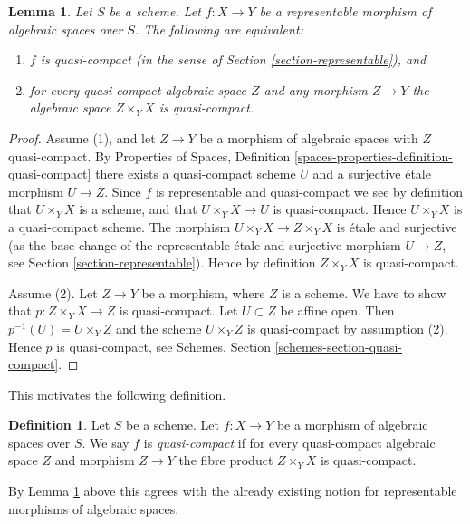 \documentclass{stacks-project}
\theoremstyle{plain}
\newtheorem{lemma}[subsection]{Lemma}
\theoremstyle{definition}
\newtheorem{definition}[subsection]{Definition}
\theoremstyle{remark}
\numberwithin{equation}{subsection}
\begin{document}
\begin{lemma}
\label{lemma-characterize-representable-quasi-compact}
Let $S$ be a scheme.
Let $f : X \to Y$ be a representable morphism of algebraic spaces over $S$.
The following are equivalent:
\begin{enumerate}
\item $f$ is quasi-compact
(in the sense of Section \ref{section-representable}), and
\item for every quasi-compact algebraic space $Z$ and any morphism
$Z \to Y$ the algebraic space $Z \times_Y X$ is quasi-compact.
\end{enumerate}
\end{lemma}

\begin{proof}
Assume (1), and let $Z \to Y$ be a morphism of algebraic spaces with
$Z$ quasi-compact. By
Properties of Spaces,
Definition \ref{spaces-properties-definition-quasi-compact}
there exists a quasi-compact scheme $U$ and a surjective \'etale
morphism $U \to Z$. Since $f$ is representable and quasi-compact
we see by definition that $U \times_Y X$ is a scheme, and that
$U \times_Y X \to U$ is quasi-compact. Hence $U \times_Y X$ is
a quasi-compact scheme. The morphism $U \times_Y X \to Z \times_Y X$
is \'etale and surjective (as the base change of the representable
\'etale and surjective morphism $U \to Z$, see
Section \ref{section-representable}).
Hence by definition $Z \times_Y X$ is quasi-compact.

\medskip\noindent
Assume (2). Let $Z \to Y$ be a morphism, where $Z$ is a scheme.
We have to show that $p : Z \times_Y X \to Z$ is quasi-compact.
Let $U \subset Z$ be affine open. Then $p^{-1}(U) = U \times_Y Z$
and the scheme $U \times_Y Z$ is quasi-compact by assumption (2).
Hence $p$ is quasi-compact, see
Schemes, Section \ref{schemes-section-quasi-compact}.
\end{proof}

\noindent
This motivates the following definition.

\begin{definition}
\label{definition-quasi-compact}
Let $S$ be a scheme.
Let $f : X \to Y$ be a morphism of algebraic spaces over $S$.
We say $f$ is {\it quasi-compact} if for every quasi-compact
algebraic space $Z$ and morphism $Z \to Y$ the fibre product
$Z \times_Y X$ is quasi-compact.
\end{definition}

\noindent
By Lemma \ref{lemma-characterize-representable-quasi-compact}
above this agrees with the already existing notion
for representable morphisms of algebraic spaces.
\end{document}
